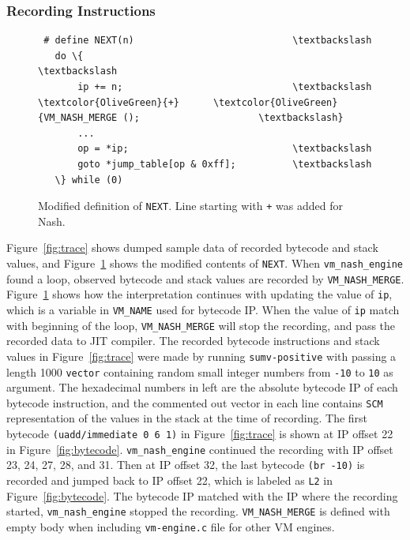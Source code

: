 \documentclass[preprint, 10pt]{sigplanconf}
\begin{document}
\subsubsection{Recording Instructions}

\begin{figure}
  \centering
  \small
\begin{Verbatim}
 # define NEXT(n)                            \textbackslash
   do \{                                      \textbackslash
       ip += n;                              \textbackslash
\textcolor{OliveGreen}{+}      \textcolor{OliveGreen}{VM_NASH_MERGE ();                     \textbackslash}
       ...
       op = *ip;                             \textbackslash
       goto *jump_table[op & 0xff];          \textbackslash
   \} while (0)
\end{Verbatim}
\caption{Modified definition of \texttt{NEXT}. Line starting with \texttt{+} was
  added for Nash.}
\label{fig:cnext}
\end{figure}

Figure~\hyperref[fig:trace]{\ref{fig:trace}} shows dumped sample data of
recorded bytecode and stack values, and
Figure~\hyperref[fig:cnext]{\ref{fig:cnext}} shows the modified contents of
\texttt{NEXT}. When \texttt{vm\_nash\_engine} found a loop, observed bytecode
and stack values are recorded by
\texttt{VM\_NASH\_MERGE}. Figure~\hyperref[fig:cnext]{\ref{fig:cnext}} shows
how the interpretation continues with updating the value of \texttt{ip}, which
is a variable in \texttt{VM\_NAME} used for bytecode IP. When the value of
\texttt{ip} match with beginning of the loop, \texttt{VM\_NASH\_MERGE} will
stop the recording, and pass the recorded data to JIT compiler. The recorded
bytecode instructions and stack values in
Figure~\hyperref[fig:trace]{\ref{fig:trace}} were made by running
\texttt{sumv-positive} with passing a length 1000 \texttt{vector} containing
random small integer numbers from \texttt{-10} to \texttt{10} as argument. The
hexadecimal numbers in left are the absolute bytecode IP of each bytecode
instruction, and the commented out vector in each line contains \texttt{SCM}
representation of the values in the stack at the time of recording.  The first
bytecode \texttt{(uadd/immediate 0 6 1)} in
Figure~\hyperref[fig:trace]{\ref{fig:trace}} is shown at IP offset 22 in
Figure~\hyperref[fig:bytecode]{\ref{fig:bytecode}}. \texttt{vm\_nash\_engine}
continued the recording with IP offset 23, 24, 27, 28, and 31. Then at IP
offset 32, the last bytecode \texttt{(br -10)} is recorded and jumped back to
IP offset 22, which is labeled as \texttt{L2} in
Figure~\hyperref[fig:bytecode]{\ref{fig:bytecode}}. The bytecode IP matched
with the IP where the recording started, \texttt{vm\_nash\_engine} stopped the
recording. \texttt{VM\_NASH\_MERGE} is defined with empty body when including
\texttt{vm-engine.c} file for other VM engines.
\end{document}
